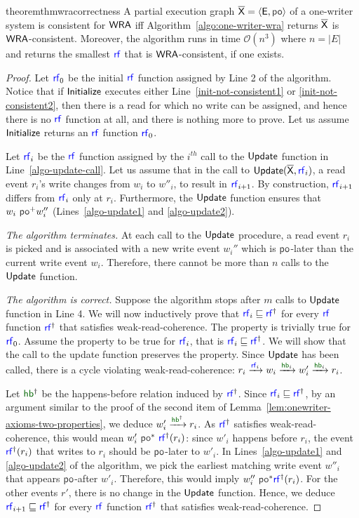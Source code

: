 \begin{restatable}{theorem}{thmwracorrectness}
A partial execution graph $\expartial = \tuple{\E, \po}$ of a one-writer system is consistent for $\mathsf{WRA}$ iff Algorithm~\ref{algo:one-writer-wra} returns $\overline{\mathsf{\color{black}X}}$ is $\mathsf{WRA}$-consistent. Moreover, the algorithm runs in time $\mathcal{O}(n^3)$ where $n = |E|$ and returns the smallest $\rf$  that is $\mathsf{WRA}$-consistent, if one exists.
\end{restatable}
\begin{proof}
Let $\rf_0$ be the initial $\rf$ function assigned by Line 2 of the algorithm. Notice that if $\mathsf{Initialize}$ executes either Line~\ref{init-not-consistent1} or \ref{init-not-consistent2}, then there is a read for which no write can be assigned, and hence there is no $\rf$ function at all, and there is nothing more to prove. Let us assume $\mathsf{Initialize}$ returns an $\rf$ function $\rf_0$. 

Let $\rf_i$ be the $\rf$ function assigned by the $i^{th}$ call to the $\mathsf{Update}$ function  in Line~\ref{algo-update-call}. Let us assume that in the call to $\update(\expartial, \rf_i)$, a read event $r_i$'s write changes from $w_i$ to $w''_i$, to result in $\rf_{i+1}$. 
By construction, $\rf_{i+1}$ differs from $\rf_i$ only at $r_i$. Furthermore, the $\mathsf{Update}$ function ensures that  $w_i ~\po^+ w''_i$ (Lines~\ref{algo-update1} and \ref{algo-update2}). 

\emph{The algorithm terminates.} At each call to the $\mathsf{Update}$ procedure, a read event $r_i$ is picked and is associated with a new write event $w_i''$ which is $\po$-later than the current write event $w_i$. Therefore, there cannot be more than $n$ calls to the  $\mathsf{Update}$ function. 

\emph{The algorithm is correct.} Suppose the algorithm stops after $m$ calls to $\mathsf{Update}$ function in Line 4. We will now inductively prove that $\rf_i \sqsubseteq \rf^\dagger$ for every  $\rf$ function $\rf^\dagger$ that satisfies weak-read-coherence. The property is trivially true for $\rf_0$. Assume the property to be true for $\rf_{i}$, that is $\rf_i \sqsubseteq \rf^\dagger$. We will show that the call to the update function preserves the property. Since $\mathsf{Update}$ has been called, there is a cycle violating weak-read-coherence: $r_i \xra{\rf_i} w_i \xra{\hb_i} w'_i \xra{\hb_i} r_i$. 

Let $\hb^\dagger$ be the happens-before relation induced by $\rf^{\dagger}$. Since $\rf_i \sqsubseteq \rf^\dagger$, by an argument similar to the proof of the second item of Lemma~\ref{lem:onewriter-axioms-two-properties}, we deduce $w'_i \xra{\hb^{\dagger}} r_i$. As $\rf^{\dagger}$ satisfies weak-read-coherence, this would mean $w'_i ~\po^*~\rf^{\dagger}(r_i)$: since $w'_i$ happens before $r_i$, the event $\rf^\dagger(r_i)$ that writes to $r_i$ should be $\po$-later to $w'_i$. In Lines~\ref{algo-update1} and \ref{algo-update2} of the algorithm, we pick the earliest matching write event $w''_i$ that appears $\po$-after $w'_i$. Therefore, this would imply $w''_i~\po^* \rf^{\dagger}(r_i)$. For the other events $r'$, there is no change in the $\mathsf{Update}$ function. Hence, we deduce $\rf_{i+1} \sqsubseteq \rf^{\dagger}$ for every $\rf$ function $\rf^{\dagger}$ that satisfies weak-read-coherence.


\end{proof}
